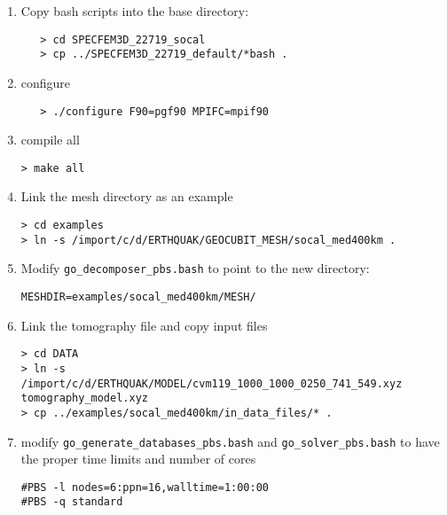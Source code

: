 \documentclass[10pt,fleqn,letterpaper]{article}
\begin{document}
\begin{enumerate}
\item Copy bash scripts into the base directory:

\begin{verbatim}
   > cd SPECFEM3D_22719_socal
   > cp ../SPECFEM3D_22719_default/*bash .
\end{verbatim}

\item configure
\begin{verbatim}
   > ./configure F90=pgf90 MPIFC=mpif90
\end{verbatim}

\item compile all
\begin{verbatim}
> make all
\end{verbatim}

\item Link the mesh directory as an example
\begin{verbatim}
> cd examples
> ln -s /import/c/d/ERTHQUAK/GEOCUBIT_MESH/socal_med400km .
\end{verbatim}

\item Modify \verb+go_decomposer_pbs.bash+ to point to the new directory:
\begin{verbatim}
MESHDIR=examples/socal_med400km/MESH/
\end{verbatim}

\item Link the tomography file and copy input files
\begin{verbatim}
> cd DATA
> ln -s /import/c/d/ERTHQUAK/MODEL/cvm119_1000_1000_0250_741_549.xyz tomography_model.xyz
> cp ../examples/socal_med400km/in_data_files/* .
\end{verbatim}

\item modify \verb+go_generate_databases_pbs.bash+ and \verb+go_solver_pbs.bash+ to have the proper time limits and number of cores
\begin{verbatim}
#PBS -l nodes=6:ppn=16,walltime=1:00:00
#PBS -q standard
\end{verbatim}

%
%


\end{enumerate}
\end{document}
